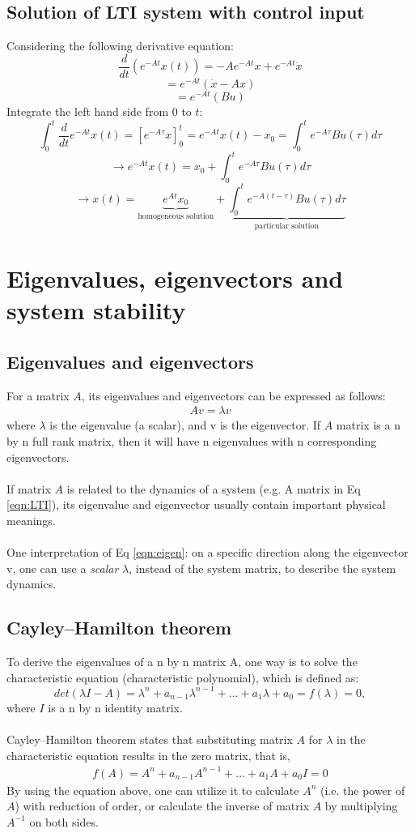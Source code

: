 \documentclass{article}
\begin{document}
\subsection{Solution of LTI system with control input}
Considering the following derivative equation:
\[\frac{d}{dt}(e^{-At}x(t))=-Ae^{-At}x+e^{-At}\dot x\]
\[=e^{-At}(\dot x-Ax)\]
\[=e^{-At}(Bu)\]
Integrate the left hand side from $0$ to $t$:
\[\int_{0}^{t} \frac{d}{dt}e^{-At}x(t)=[e^{-A\tau}x]_0^t=e^{-At}x(t)-x_0=\int_0^te^{-A\tau}Bu(\tau)d\tau\]
\[\rightarrow e^{-At}x(t)=x_0+\int_0^te^{-A\tau}Bu(\tau)d\tau\]
\[\rightarrow x(t)=\underbrace{e^{At}x_0}_\text{homogeneous solution}+\underbrace{\int_0^te^{-A(t-\tau)}Bu(\tau)d\tau}_\text{particular solution}\]


\section{Eigenvalues, eigenvectors and system stability}
\subsection{Eigenvalues and eigenvectors}
For a matrix $A$, its eigenvalues and eigenvectors can be expressed as follows:
\begin{align}
\label{eqn:eigen}
Av=\lambda v
\end{align}
where $\lambda$ is the eigenvalue (a scalar), and v is the eigenvector.
If $A$ matrix is a n by n full rank matrix, then it will have n eigenvalues with n corresponding eigenvectors.\\\\
If matrix $A$ is related to the dynamics of a system (e.g. A matrix in Eq \eqref{eqn:LTI}), its eigenvalue and eigenvector usually contain important physical meanings.\\\\
One interpretation of Eq \eqref{eqn:eigen}: on a specific direction along the eigenvector v, one can use a \emph{scalar} $\lambda$, instead of the system matrix, to describe the system dynamics.

\subsection{Cayley–Hamilton theorem}
To derive the eigenvalues of a n by n matrix A, one way is to solve the characteristic equation (characteristic polynomial), which is defined as:
\[det(\lambda I-A)=\lambda^n+a_{n-1}\lambda^{n-1}+\ldots+a_1\lambda+a_0=f(\lambda)=0, \]
where $I$ is a n by n identity matrix.\\\\
Cayley–Hamilton theorem states that substituting matrix $A$ for $\lambda$ in the characteristic equation results in the zero matrix, that is,
\begin{align}
\label{eqn:CH}
f(A)=A^n+a_{n-1}A^{n-1}+\ldots+a_1A+a_0I=0
\end{align}
By using the equation above, one can utilize it to calculate $A^n$ (i.e. the power of $A$) with reduction of order, or calculate the inverse of matrix $A$ by multiplying $A^{-1}$ on both sides.
\end{document}
